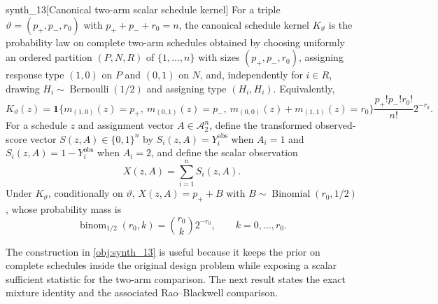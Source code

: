 \documentclass[11pt]{article}
\begin{document}
\begin{definitionv}{synth_13}[Canonical two-arm scalar schedule kernel]
For a triple $\vartheta=(p_+,p_-,r_0)$ with $p_++p_-+r_0=n$, the canonical schedule kernel $K_\vartheta$ is the probability law on complete two-arm schedules obtained by choosing uniformly an ordered partition $(P,N,R)$ of $\{1,\ldots,n\}$ with sizes $(p_+,p_-,r_0)$, assigning response type $(1,0)$ on $P$ and $(0,1)$ on $N$, and, independently for $i\in R$, drawing $H_i\sim\operatorname{Bernoulli}(1/2)$ and assigning type $(H_i,H_i)$. Equivalently,
\[
K_\vartheta(z)=\mathbf 1\{m_{(1,0)}(z)=p_+,\ m_{(0,1)}(z)=p_-,\ m_{(0,0)}(z)+m_{(1,1)}(z)=r_0\}\frac{p_+!p_-!r_0!}{n!}2^{-r_0}.
\]
For a schedule $z$ and assignment vector $A\in\mathcal A_2^n$, define the transformed observed-score vector $S(z,A)\in\{0,1\}^n$ by $S_i(z,A)=Y_i^{\mathrm{obs}}$ when $A_i=1$ and $S_i(z,A)=1-Y_i^{\mathrm{obs}}$ when $A_i=2$, and define the scalar observation
\[
X(z,A)=\sum_{i=1}^n S_i(z,A).
\]
Under $K_\vartheta$, conditionally on $\vartheta$, $X(z,A)=p_++B$ with $B\sim\operatorname{Binomial}(r_0,1/2)$, whose probability mass is
\[
\operatorname{binom}_{1/2}(r_0,k)=\binom{r_0}{k}2^{-r_0},\qquad k=0,\ldots,r_0.
\]
\end{definitionv}

The construction in \cref{obj:synth_13} is useful because it keeps the prior on complete schedules inside the original design problem while exposing a scalar sufficient statistic for the two-arm comparison. The next result states the exact mixture identity and the associated Rao--Blackwell comparison.
\end{document}
